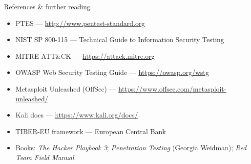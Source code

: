 \documentclass[aspectratio=169,11pt]{beamer}
\begin{document}

\begin{frame}{References \& further reading}
  \footnotesize
  \begin{itemize}
    \item PTES --- \url{http://www.pentest-standard.org}
    \item NIST SP 800-115 --- Technical Guide to Information Security Testing
    \item MITRE ATT\&CK --- \url{https://attack.mitre.org}
    \item OWASP Web Security Testing Guide --- \url{https://owasp.org/wstg}
    \item Metasploit Unleashed (OffSec) --- \url{https://www.offsec.com/metasploit-unleashed/}
    \item Kali docs --- \url{https://www.kali.org/docs/}
    \item TIBER-EU framework --- European Central Bank
    \item Books: \emph{The Hacker Playbook 3}; \emph{Penetration Testing}
          (Georgia Weidman); \emph{Red Team Field Manual}.
  \end{itemize}
\end{frame}
\end{document}
